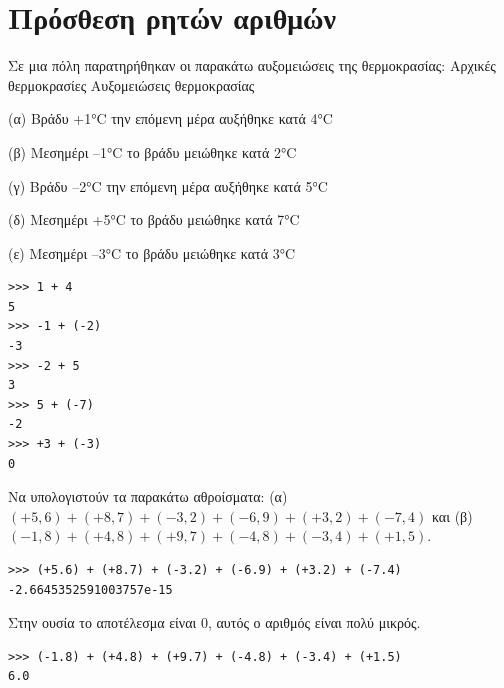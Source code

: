 \section{Πρόσθεση ρητών αριθμών}
\begin{exercise}
Σε μια πόλη παρατηρήθηκαν οι παρακάτω αυξομειώσεις της θερμοκρασίας:
Αρχικές θερμοκρασίες Αυξομειώσεις θερμοκρασίας

(α) Βράδυ +1°C την επόμενη μέρα αυξήθηκε κατά 4°C

(β) Μεσημέρι –1°C το βράδυ μειώθηκε κατά 2°C

(γ) Βράδυ –2°C την επόμενη μέρα αυξήθηκε κατά 5°C

(δ) Μεσημέρι +5°C το βράδυ μειώθηκε κατά 7°C

(ε) Μεσημέρι –3°C το βράδυ μειώθηκε κατά 3°C
\end{exercise}
\begin{lstlisting}
>>> 1 + 4
5
>>> -1 + (-2)
-3
>>> -2 + 5
3
>>> 5 + (-7)
-2
>>> +3 + (-3)
0
\end{lstlisting}
\begin{exercise}
Να υπολογιστούν τα παρακάτω αθροίσματα:
(α) $(+5,6) + (+8,7) + (-3,2) + (-6,9) + (+3,2) + (-7,4)$ και
(β) $(-1,8) + (+4,8) + (+9,7) + (-4,8) + (-3,4) + (+1,5)$.
\end{exercise}
\begin{lstlisting}
>>> (+5.6) + (+8.7) + (-3.2) + (-6.9) + (+3.2) + (-7.4)
-2.6645352591003757e-15
\end{lstlisting}
Στην ουσία το αποτέλεσμα είναι 0, αυτός ο αριθμός είναι πολύ μικρός.
\begin{lstlisting}
>>> (-1.8) + (+4.8) + (+9.7) + (-4.8) + (-3.4) + (+1.5)
6.0
\end{lstlisting}

